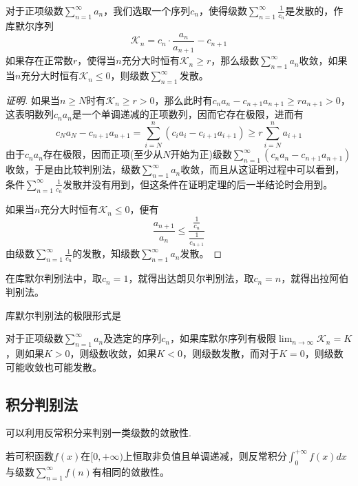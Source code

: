 \begin{theorem}
  对于正项级数$\sum_{n=1}^{\infty}a_n$，我们选取一个序列$c_n$，使得级数$\sum_{n=1}^{\infty}\frac{1}{c_n}$是发散的，作库默尔序列
  \[ \mathcal{K}_n = c_n \cdot \frac{a_n}{a_{n+1}} - c_{n+1} \]
  如果存在正常数$r$，使得当$n$充分大时恒有$\mathcal{K}_n \geqslant r$，那么级数$\sum_{n=1}^{\infty}a_n$收敛，如果当$n$充分大时恒有$\mathcal{K}_n \leqslant 0$，则级数$\sum_{n=1}^{\infty}$发散。
\end{theorem}

\begin{proof}[证明]
  如果当$n \geqslant N$时有$\mathcal{K}_n \geqslant r > 0$，那么此时有$c_na_n-c_{n+1}a_{n+1} \geqslant r a_{n+1} > 0$，这表明数列$c_na_n$是一个单调递减的正项数列，因而它存在极限，进而有
  \[ c_Na_N-c_{n+1}a_{n+1} = \sum_{i=N}^n (c_ia_i-c_{i+1}a_{i+1}) \geqslant r \sum_{i=N}^n a_{i+1} \]
  由于$c_na_n$存在极限，因而正项(至少从$N$开始为正)级数$\sum_{n=1}^{\infty}(c_na_n-c_{n+1}a_{n+1})$收敛，于是由比较判别法，级数$\sum_{n=1}^{\infty}a_n$收敛，而且从这证明过程中可以看到，条件$\sum_{n=1}^{\infty}\frac{1}{c_n}$发散并没有用到，但这条件在证明定理的后一半结论时会用到。

  如果当$n$充分大时恒有$\mathcal{K}_n \leqslant 0$，便有
  \[ \frac{a_{n+1}}{a_n} \leqslant \frac{\frac{1}{c_n}}{\frac{1}{c_{n+1}}} \]
  由级数$\sum_{n=1}^{\infty}\frac{1}{c_n}$的发散，知级数$\sum_{n=1}^{\infty}a_n$发散。
\end{proof}

在库默尔判别法中，取$c_n=1$，就得出达朗贝尔判别法，取$c_n=n$，就得出拉阿伯判别法。

库默尔判别法的极限形式是
\begin{theorem}
  对于正项级数$\sum_{n=1}^{\infty}a_n$及选定的序列$c_n$，如果库默尔序列有极限$\lim_{n \to \infty} \mathcal{K}_n=K$，则如果$K>0$，则级数收敛，如果$K<0$，则级数发散，而对于$K=0$，则级数可能收敛也可能发散。
\end{theorem}

\subsection{积分判别法}
\label{sec:the-integrate-method-of-determination-number-series}

可以利用反常积分来判别一类级数的敛散性.
\begin{theorem}[积分判别法]
  若可积函数$f(x)$在$[0,+\infty)$上恒取非负值且单调递减，则反常积分$\int_0^{+\infty}f(x)dx$与级数$\sum_{n=1}^{\infty}f(n)$有相同的敛散性。
\end{theorem}

